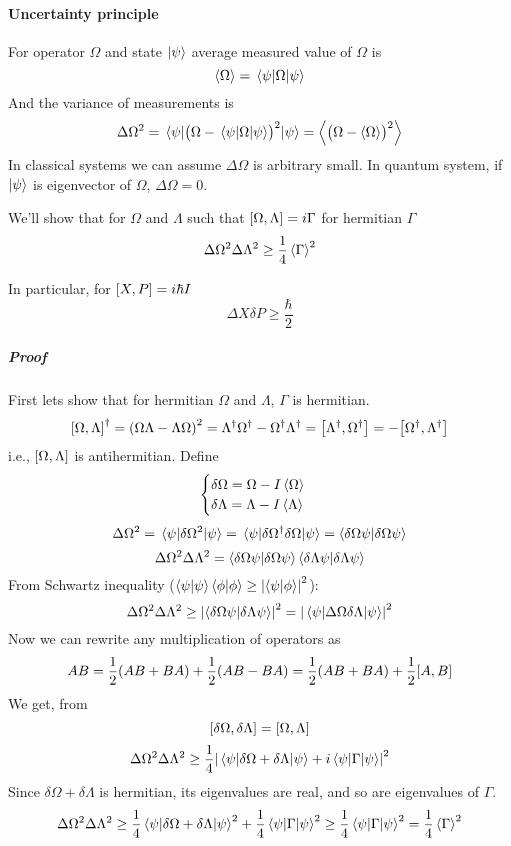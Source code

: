 
\paragraph{Uncertainty principle}
For operator $\Omega$ and state $\ket{\psi}$ average measured value of $\Omega$ is
$$\expval{\Omega} = \mel{\psi}{\Omega}{\psi}$$
And the variance of measurements is
$$\Delta \Omega^2 = \mel{\psi}{\qty\big(\Omega - \mel{\psi}{\Omega}{\psi})^2}{\psi} = \expval{\qty\big(\Omega - \expval{\Omega})^2}$$ 
In classical systems we can assume $\Delta \Omega$ is arbitrary small. In quantum system, if $\ket{\psi}$ is eigenvector of $\Omega$, $\Delta \Omega = 0$.

We'll show that for $\Omega$ and $\Lambda$ such that $\comm{\Omega}{\Lambda} = i \Gamma$ for hermitian $\Gamma$
$$\Delta \Omega^2 \Delta \Lambda^2 \geq \frac{1}{4} \expval{\Gamma}^2$$

In particular, for $\comm{X}{P} = i\hbar I$
$$\Delta X \delta P \geq \frac{\hbar}{2}$$
\subparagraph{Proof}
First lets show that for hermitian  $\Omega$ and $\Lambda$, $\Gamma$ is hermitian.
$$\comm{\Omega}{\Lambda}^\dagger = \qty(\Omega\Lambda - \Lambda\Omega)^2 = \Lambda^\dagger \Omega^\dagger - \Omega^\dagger \Lambda^\dagger = \comm{\Lambda^\dagger}{\Omega^\dagger} = -\comm{\Omega^\dagger}{\Lambda^\dagger}$$
i.e., $\comm{\Omega}{\Lambda}$ is antihermitian.
Define
$$\begin{cases}
\delta \Omega= \Omega - I\expval{\Omega}\\
\delta \Lambda= \Lambda - I\expval{\Lambda}\\
\end{cases}$$
$$\Delta \Omega^2 = \mel{\psi}{\delta \Omega^2}{\psi} = \mel{\psi}{\delta \Omega^\dagger \delta \Omega}{\psi}  = \braket{\delta \Omega\psi}{\delta \Omega\psi}$$
$$\Delta \Omega^2 \Delta \Lambda^2  = \braket{\delta \Omega\psi}{\delta \Omega\psi}\braket{\delta \Lambda\psi}{\delta \Lambda\psi}$$
From Schwartz inequality ($\braket{\psi}{\psi} \braket{\phi}{\phi} \geq \abs{\braket{\psi}{\phi}}^2$):
$$\Delta \Omega^2 \Delta \Lambda^2  \geq \abs{\braket{\delta \Omega\psi}{\delta \Lambda\psi}}^2 = \abs{\mel{\psi}{\Delta \Omega \delta \Lambda}{\psi}}^2$$
Now we can rewrite any multiplication of operators as
$$AB = \frac{1}{2} (AB+BA) + \frac{1}{2}(AB-BA) =\frac{1}{2} (AB+BA) + \frac{1}{2}\comm{A}{B} $$
We get, from
$$\comm{\delta \Omega}{\delta \Lambda} = \comm{\Omega}{\Lambda}$$
$$\Delta \Omega^2 \Delta \Lambda^2  \geq \frac{1}{4}\abs{\mel{\psi}{\delta \Omega + \delta \Lambda}{\psi}+ i \mel{\psi}{\Gamma}{\psi}}^2$$
Since $\delta \Omega + \delta \Lambda$ is hermitian, its eigenvalues are real, and so are eigenvalues of $\Gamma$.
$$\Delta \Omega^2 \Delta \Lambda^2  \geq \frac{1}{4}{\mel{\psi}{\delta \Omega + \delta \Lambda}{\psi}}^2+ \frac{1}{4} {\mel{\psi}{\Gamma}{\psi}}^2\geq \frac{1}{4} {\mel{\psi}{\Gamma}{\psi}}^2 = \frac{1}{4} \expval{\Gamma}^2$$
